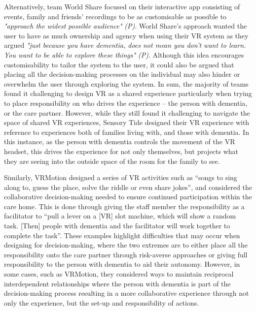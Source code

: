 Alternatively, team World Share focused on their interactive app consisting of events, family and friends’ recordings to be as customisable as possible to \textit{"approach the widest possible audience" (P)}. World Share's approach wanted the user to have as much ownership and agency when using their VR system as they argued \textit{"just because you have dementia, does not mean you don't want to learn. You want to be able to explore these things" (P)}. Although this idea encourages customisability to tailor the system to the user, it could also be argued that placing all the decision-making processes on the individual may also hinder or overwhelm the user through exploring the system. In sum, the majority of teams found it challenging to design VR as a shared experience particularly when trying to place responsibility on who drives the experience – the person with dementia, or the care partner. However, while they still found it challenging to navigate the space of shared VR experiences, Sensory Tide designed their VR experience with reference to experiences both of families living with, and those with dementia. In this instance, as the person with dementia controls the movement of the VR headset, this drives the experience for not only themselves, but projects what they are seeing into the outside space of the room for the family to see.  

Similarly, VRMotion designed a series of VR activities such as “songs to sing along to, guess the place, solve the riddle or even share jokes”, and considered the collaborative decision-making needed to ensure continued participation within the care home. This is done through giving the staff member the responsibility as a facilitator to “pull a lever on a [VR] slot machine, which will show a random task. [Then] people with dementia and the facilitator will work together to complete the task”. These examples highlight difficulties that may occur when designing for decision-making, where the two extremes are to either place all the responsibility onto the care partner through risk-averse approaches or giving full responsibility to the person with dementia to aid their autonomy. However, in some cases, such as VRMotion, they considered ways to maintain reciprocal interdependent relationships where the person with dementia is part of the decision-making process resulting in a more collaborative experience through not only the experience, but the set-up and responsibility of actions. 

